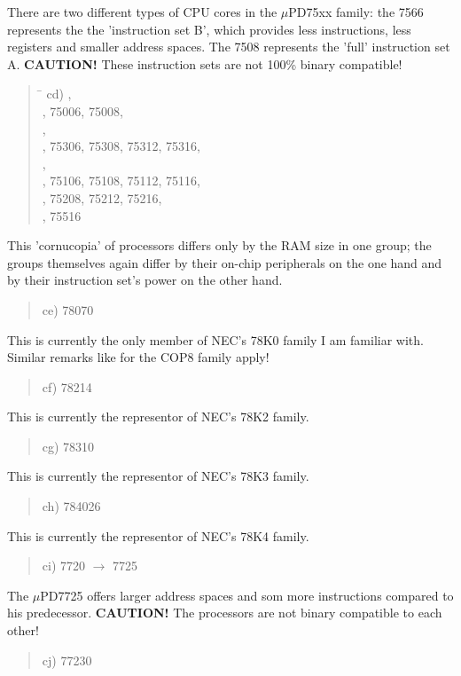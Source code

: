\documentclass[12pt,twoside]{report}
\begin{document}
There are two different types of CPU cores in the $\mu$PD75xx
family: the 7566 represents the the 'instruction set B', which
provides less instructions, less registers and smaller address
spaces.  The 7508 represents the 'full' instruction set A.  {\bf
CAUTION!} These instruction sets are not 100\% binary compatible!
\begin{quote}
\begin{tabbing}
\hspace{0.7cm} \= \kill
cd) ,\\
    , 75006, 75008,\\
    ,\\
    , 75306, 75308, 75312, 75316,\\
    ,\\
    , 75106, 75108, 75112, 75116,\\
    , 75208, 75212, 75216,\\
    , 75516\\
\end{tabbing}
\end{quote}
This 'cornucopia' of processors differs only by the RAM size in one
group; the groups themselves again differ by their on-chip
peripherals on the one hand and by their instruction set's power on
the other hand.
\begin{quote}
ce) 78070
\end{quote}
This is currently the only member of NEC's 78K0 family I am familiar
with.  Similar remarks like for the COP8 family apply!
\begin{quote}
cf) 78214
\end{quote}
This is currently the representor of NEC's 78K2 family.
\begin{quote}
cg) 78310
\end{quote}
This is currently the representor of NEC's 78K3 family.
\begin{quote}
ch) 784026
\end{quote}
This is currently the representor of NEC's 78K4 family.
\begin{quote}
ci) 7720 $\rightarrow$ 7725
\end{quote}
The $\mu$PD7725 offers larger address spaces and som more instructions
compared to his predecessor. {\bf CAUTION!}  The processors are not binary
compatible to each other!
\begin{quote}
cj) 77230
\end{quote}
\end{document}
